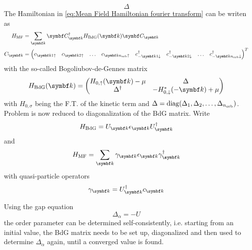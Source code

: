 \documentclass[../notes.tex]{subfiles}
\begin{document}
\begin{equation}
	\Delta
\end{equation}
The Hamiltonian in \cref{eq:Mean Field Hamiltonian fourier transform} can be writen as 
\begin{align}
	H_{\mathrm{MF}} &= \sum_{\vb{k}} \vb{C}_{\vb{k}}^{\dagger} H_{\mathrm{BdG}} (\vb{k}) \vb{C}_{\vb{k}} \\
	C_{\vb{k}} &= 
		\begin{pmatrix}
			c_{\vb{k} 1 \uparrow} & 
			c_{\vb{k} 2 \uparrow} &
			\ldots &
			c_{\vb{k} n_{\mathrm{orb}} \uparrow} &
			c_{-\vb{k} 1 \downarrow}^{\dagger} &
			c_{-\vb{k} 2 \downarrow}^{\dagger} &
			\ldots &
			c_{-\vb{k} n_{\mathrm{orb}} \downarrow}^{\dagger}
		\end{pmatrix}^{T}
\end{align}
with the so-called Bogoliubov-de-Gennes matrix
\begin{equation}
	H_{\mathrm{BdG}} (\vb{k}) =
	\begin{pmatrix}
		H_{0, \uparrow} (\vb{k}) - \mu & \Delta \\
		\Delta^{\dagger} & - H_{0, \downarrow}^* (-\vb{k}) + \mu
	\end{pmatrix}
\end{equation}
with \(H_{0, \sigma}\) being the F.T. of the kinetic term and \(\Delta = \operatorname{diag}(\Delta_1, \Delta_2, \ldots, \Delta_{n_{\mathrm{orb}}})\).
Problem is  now reduced to diagonalization of the BdG matrix.
Write
\begin{equation}
	H_{\mathrm{BdG}} = U_{\vb{k}} \epsilon_{\vb{k}} U_{\vb{k}}^{\dagger}
\end{equation}
and 
\begin{equation}
	H_{\mathrm{MF}} = \sum_{\vb{k}} \gamma_{\vb{k}} \epsilon_{\vb{k}} \gamma_{\vb{k}}^{\dagger}
\end{equation}
with quasi-particle operators
\begin{equation}
	\gamma_{\vb{k}} = U_{\vb{k}}^{\dagger} c_{\vb{k}}
\end{equation}


Using the gap equation
\begin{equation}
	\Delta_{\alpha} = -U
\end{equation}
the order parameter can be determined self-consistently, i.e. starting from an initial value, the BdG matrix needs to be set up, diagonalized and then used to determine \(\Delta_{\alpha}\) again, until a converged value is found.
\end{document}
